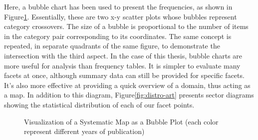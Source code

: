             Here, a bubble chart has been used to present the frequencies, as shown in Figure\ref{fig:viz-smb}. Essentially, these are two x-y scatter plots whose bubbles represent category crossovers. The size of a bubble is proportional to the number of items in the category pair corresponding to its coordinates. The same concept is repeated, in separate quadrants of the same figure, to demonstrate the intersection with the third aspect. In the case of this thesis, bubble charts are more useful for analysis than frequency tables. It is simpler to evaluate many facets at once, although summary data can still be provided for specific facets. It's also more effective at providing a quick overview of a domain, thus acting as a map. In addition to this diagram, Figure\ref{fig:distro-art} presents sector diagrams showing the statistical distribution of each of our facet points.

            
            \begin{figure}[h]
            \centering
            \caption{\label{fig:viz-smb}  Visualization of a Systematic Map as a Bubble Plot (each color represent different years of publication)}
            \end{figure}

